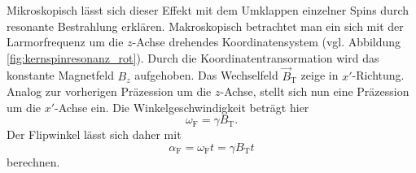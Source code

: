 \documentclass[
    11pt,
    ngerman
]{scrreprt}
\begin{document}
Mikroskopisch lässt sich dieser Effekt mit dem Umklappen einzelner Spins durch
resonante Bestrahlung erklären. Makroskopisch betrachtet man ein sich mit der
Larmorfrequenz um die $z$-Achse drehendes Koordinatensystem (vgl. Abbildung
\ref{fig:kernspinresonanz_rot}). Durch die Koordinatentransormation wird das
konstante Magnetfeld $B_z$ aufgehoben. Das Wechselfeld $\vec B_\text{T}$ zeige
in $x'$-Richtung. Analog zur vorherigen Präzession um die $z$-Achse, stellt
sich nun eine Präzession um die $x'$-Achse ein. Die Winkelgeschwindigkeit
beträgt hier
\[
    \omega_\text{F} = \gamma B_\text{T}.
\]
Der Flipwinkel lässt sich daher mit
\[
    \alpha_\text{F} = \omega_\text{F} t = \gamma B_\text{T} t
\]
berechnen.

\begin{figure}[htbp]
    \begin{minipage}[htbp]{.45\textwidth}
        \centering
\end{minipage}
\end{figure}
\end{document}
